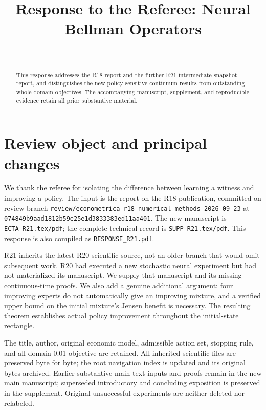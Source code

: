 \documentclass[ecta]{econsocart}
\theoremstyle{remark}
\begin{document}
\begin{frontmatter}
\title{Response to the Referee: Neural Bellman Operators}
\begin{aug}
\author[id=au1,addressref={add1}]{~}
\address[id=add1]{}
\end{aug}
\begin{abstract}
This response addresses the R18 report and the further R21 intermediate-snapshot report, and distinguishes the new policy-sensitive continuum results from outstanding whole-domain objectives. The accompanying manuscript, supplement, and reproducible evidence retain all prior substantive material.
\end{abstract}
\end{frontmatter}
\section{Review object and principal changes}
We thank the referee for isolating the difference between learning a witness and improving a policy. The input is the report on the R18 publication, committed on review branch \nolinkurl{review/econometrica-r18-numerical-methods-2026-09-23} at \nolinkurl{074849b9aad1812b59e25e1d3833383ed11aa401}. The new manuscript is \nolinkurl{ECTA_R21.tex/pdf}; the complete technical record is \nolinkurl{SUPP_R21.tex/pdf}. This response is also compiled as \nolinkurl{RESPONSE_R21.pdf}.

R21 inherits the latest R20 scientific source, not an older branch that would omit subsequent work. R20 had executed a new stochastic neural experiment but had not materialized its manuscript. We supply that manuscript and its missing continuous-time proofs. We also add a genuine additional argument: four improving experts do not automatically give an improving mixture, and a verified upper bound on the initial mixture's Jensen benefit is necessary. The resulting theorem establishes actual policy improvement throughout the initial-state rectangle.

The title, author, original economic model, admissible action set, stopping rule, and all-domain 0.01 objective are retained. All inherited scientific files are preserved byte for byte; the root navigation index is updated and its original bytes archived. Earlier substantive main-text inputs and proofs remain in the new main manuscript; superseded introductory and concluding exposition is preserved in the supplement. Original unsuccessful experiments are neither deleted nor relabeled.
\end{document}
